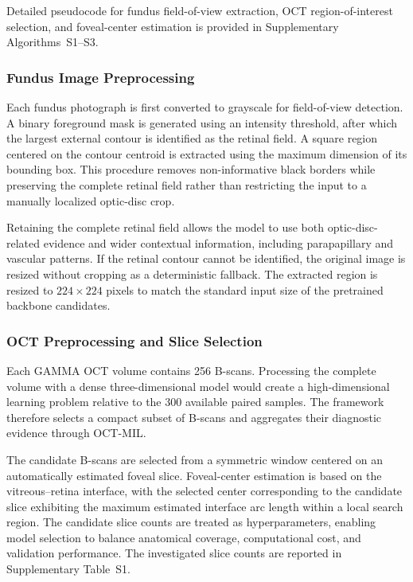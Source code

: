 \documentclass[preprint,12pt]{elsarticle}
\begin{document}
Detailed pseudocode for fundus field-of-view extraction, OCT region-of-interest selection, and foveal-center estimation is provided in Supplementary Algorithms~S1--S3.

\subsubsection{Fundus Image Preprocessing}
\label{subsubsec:fundus_preprocessing}

Each fundus photograph is first converted to grayscale for field-of-view detection. A binary foreground mask is generated using an intensity threshold, after which the largest external contour is identified as the retinal field. A square region centered on the contour centroid is extracted using the maximum dimension of its bounding box. This procedure removes non-informative black borders while preserving the complete retinal field rather than restricting the input to a manually localized optic-disc crop.

Retaining the complete retinal field allows the model to use both optic-disc-related evidence and wider contextual information, including parapapillary and vascular patterns. If the retinal contour cannot be identified, the original image is resized without cropping as a deterministic fallback. The extracted region is resized to $224\times224$ pixels to match the standard input size of the pretrained backbone candidates.

\subsubsection{OCT Preprocessing and Slice Selection}
\label{subsubsec:oct_preprocessing}

Each GAMMA OCT volume contains 256 B-scans. Processing the complete volume with a dense three-dimensional model would create a high-dimensional learning problem relative to the 300 available paired samples. The framework therefore selects a compact subset of B-scans and aggregates their diagnostic evidence through OCT-MIL.

The candidate B-scans are selected from a symmetric window centered on an automatically estimated foveal slice. Foveal-center estimation is based on the vitreous--retina interface, with the selected center corresponding to the candidate slice exhibiting the maximum estimated interface arc length within a local search region. The candidate slice counts are treated as hyperparameters, enabling model selection to balance anatomical coverage, computational cost, and validation performance. The investigated slice counts are reported in Supplementary Table~S1.
\end{document}
